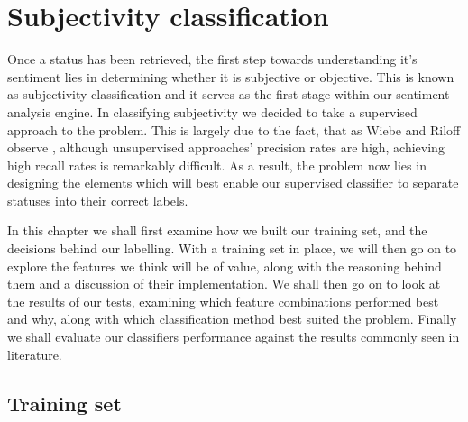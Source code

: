 % 			
% 
% 
% 
% 
% 
% 

% 
% 

\chapter{Subjectivity classification}
\label{subjectivity}

Once a status has been retrieved, the first step towards understanding it's sentiment lies in determining whether it is subjective or objective. This is known as subjectivity classification and it serves as the first stage within our sentiment analysis engine. In classifying subjectivity we decided to take a supervised approach to the problem. This is largely due to the fact, that as Wiebe and Riloff observe \cite{Wiebe:2003wa}, although unsupervised approaches' precision rates are high, achieving high recall rates is remarkably difficult. As a result, the problem now lies in designing the elements which will best enable our supervised classifier to separate statuses into their correct labels.

In this chapter we shall first examine how we built our training set, and the decisions behind our labelling. With a training set in place, we will then go on to explore the features we think will be of value, along with the reasoning behind them and a discussion of their implementation. We shall then go on to look at the results of our tests, examining which feature combinations performed best and why, along with which classification method best suited the problem. Finally we shall evaluate our classifiers performance against the results commonly seen in literature.

\section{Training set}
\label{subjectvity:training}

